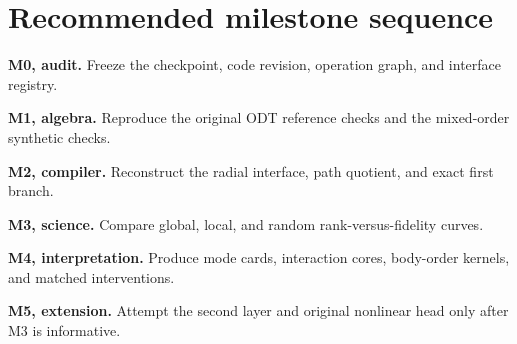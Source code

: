 \documentclass[10pt,twocolumn]{article}
\begin{document}
\section{Recommended milestone sequence}

\textbf{M0, audit.} Freeze the checkpoint, code revision, operation graph, and interface registry.

\textbf{M1, algebra.} Reproduce the original ODT reference checks and the mixed-order synthetic checks.

\textbf{M2, compiler.} Reconstruct the radial interface, path quotient, and exact first branch.

\textbf{M3, science.} Compare global, local, and random rank-versus-fidelity curves.

\textbf{M4, interpretation.} Produce mode cards, interaction cores, body-order kernels, and matched interventions.

\textbf{M5, extension.} Attempt the second layer and original nonlinear head only after M3 is informative.
\end{document}
